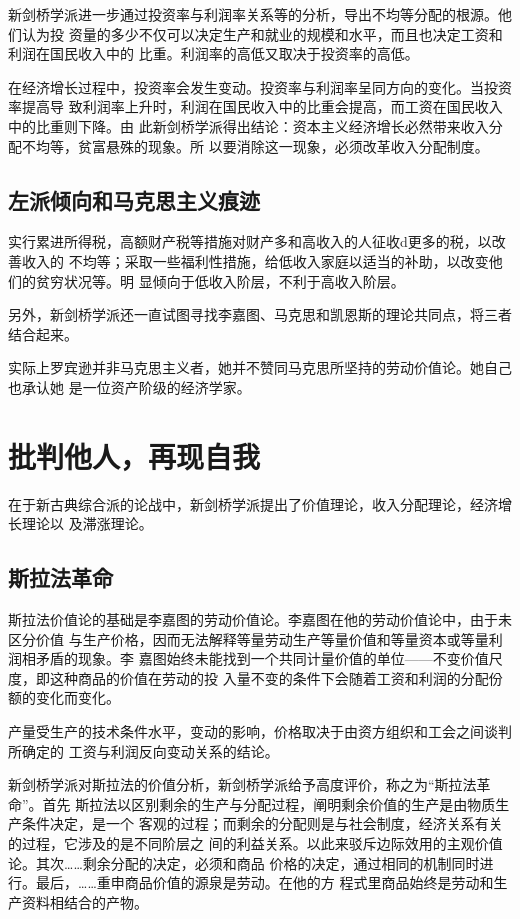 新剑桥学派进一步通过投资率与利润率关系等的分析，导出不均等分配的根源。他们认为投
资量的多少不仅可以决定生产和就业的规模和水平，而且也决定工资和利润在国民收入中的
比重。利润率的高低又取决于投资率的高低。

在经济增长过程中，投资率会发生变动。投资率与利润率呈同方向的变化。当投资率提高导
致利润率上升时，利润在国民收入中的比重会提高，而工资在国民收入中的比重则下降。由
此新剑桥学派得出结论：资本主义经济增长必然带来收入分配不均等，贫富悬殊的现象。所
以要消除这一现象，必须改革收入分配制度。

\subsection{左派倾向和马克思主义痕迹}

实行累进所得税，高额财产税等措施对财产多和高收入的人征收d更多的税，以改善收入的
不均等；采取一些福利性措施，给低收入家庭以适当的补助，以改变他们的贫穷状况等。明
显倾向于低收入阶层，不利于高收入阶层。

另外，新剑桥学派还一直试图寻找李嘉图、马克思和凯恩斯的理论共同点，将三者结合起来。

实际上罗宾逊并非马克思主义者，她并不赞同马克思所坚持的劳动价值论。她自己也承认她
是一位资产阶级的经济学家。

\section{批判他人，再现自我}

在于新古典综合派的论战中，新剑桥学派提出了价值理论，收入分配理论，经济增长理论以
及滞涨理论。

\subsection{斯拉法革命}

斯拉法价值论的基础是李嘉图的劳动价值论。李嘉图在他的劳动价值论中，由于未区分价值
与生产价格，因而无法解释等量劳动生产等量价值和等量资本或等量利润相矛盾的现象。李
嘉图始终未能找到一个共同计量价值的单位——不变价值尺度，即这种商品的价值在劳动的投
入量不变的条件下会随着工资和利润的分配份额的变化而变化。

产量受生产的技术条件水平，变动的影响，价格取决于由资方组织和工会之间谈判所确定的
工资与利润反向变动关系的结论。

新剑桥学派对斯拉法的价值分析，新剑桥学派给予高度评价，称之为“斯拉法革命”。首先
斯拉法以区别剩余的生产与分配过程，阐明剩余价值的生产是由物质生产条件决定，是一个
客观的过程；而剩余的分配则是与社会制度，经济关系有关的过程，它涉及的是不同阶层之
间的利益关系。以此来驳斥边际效用的主观价值论。其次……剩余分配的决定，必须和商品
价格的决定，通过相同的机制同时进行。最后，……重申商品价值的源泉是劳动。在他的方
程式里商品始终是劳动和生产资料相结合的产物。

